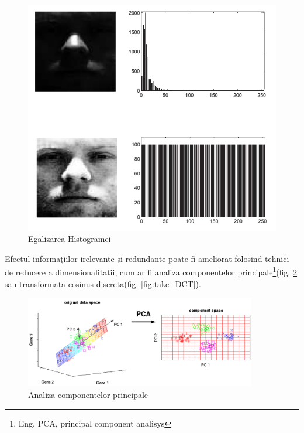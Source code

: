 \begin{figure}[H]
	\includegraphics[width=1.0\textwidth]{imagini/histogram_equalization.png}
	\caption{Egalizarea Histogramei\protect\footnotemark}
	\label{fig:egalizarea_histogrameis}
\end{figure}


Efectul informațiilor irelevante și redundante poate fi ameliorat folosind tehnici de reducere a dimensionalitatii, cum ar fi analiza componentelor principale\footnote{Eng. PCA, principal component analisys}(fig. \ref{fig:fig_pca_principal_component_analysis} sau transformata cosinus discreta(fig. \ref{fig:take_DCT}).

\begin{figure}[H]
	\centering
		\includegraphics[width=0.90\textwidth]{imagini/fig_pca_principal_component_analysis.png}
	\caption{Analiza componentelor principale\protect\footnotemark}
	\label{fig:fig_pca_principal_component_analysis}
\end{figure}

